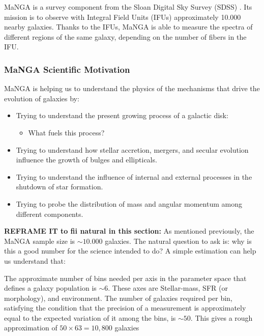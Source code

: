 MaNGA is a survey component from the Sloan Digital Sky Survey (SDSS) \citep{bundy2015, ahumada2020}. Its mission is to observe with Integral Field Units (IFUs) approximately 10.000 nearby galaxies. Thanks to the IFUs, MaNGA is able to measure the spectra of different regions of the same galaxy, depending on the number of fibers in the IFU.

\subsubsection*{MaNGA Scientific Motivation}

MaNGA is helping us to understand the physics of the mechanisms that drive the evolution of galaxies by:

\begin{itemize}

  \item Trying to understand the present growing process of a galactic disk:

  \begin{itemize}
    \item What fuels this process?
  \end{itemize}

  \item Trying to understand how stellar accretion, mergers, and secular evolution influence the growth of bulges and ellipticals.

  \item Trying to understand the influence of internal and external processes in the shutdown of star formation.
  
  \item Trying to probe the distribution of mass and angular momentum among different components.
\end{itemize}

\textbf{REFRAME IT to fii natural in this section:} As mentioned previously, the MaNGA sample size is $\sim 10.000$ galaxies. The natural question to ask is: why is this a good number for the science intended to do? A simple estimation can help us understand that:

The approximate number of bins needed per axis in the parameter space that defines a galaxy population is $\sim 6$. These axes are Stellar-mass, SFR (or morphology), and environment. The number of galaxies required per bin, satisfying the condition that the precision of a measurement is approximately equal to the expected variation of it among the bins, is $\sim 50$. This gives a rough approximation of $50 \times 63 = 10,800$ galaxies

